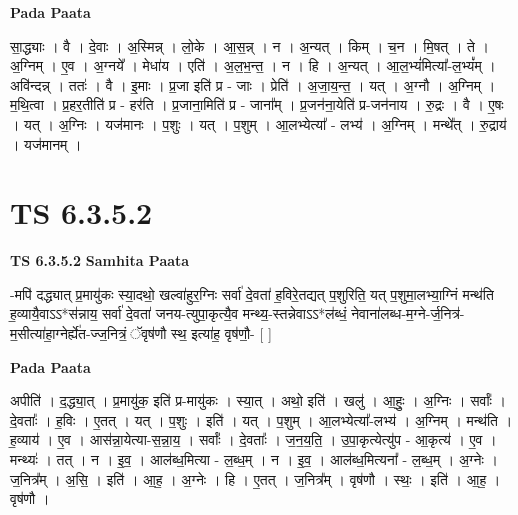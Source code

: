 \documentclass[17pt]{extarticle}
\begin{document}
\textbf{Pada Paata} \newline

सा॒द्ध्याः । वै । दे॒वाः । अ॒स्मिन्न् । लो॒के । आ॒स॒न्न् । न । अ॒न्यत् । किम् । च॒न । मि॒षत् । ते । अ॒ग्निम् । ए॒व । अ॒ग्नये᳚ । मेधा॑य । एति॑ । अ॒ल॒भ॒न्त॒ । न । हि । अ॒न्यत् । आ॒ल॒भ्यं॑मित्या᳚-ल॒भ्यं᳚म् । अवि॑न्दन्न् । ततः॑ । वै । इ॒माः । प्र॒जा इति॑ प्र - जाः । प्रेति॑ । अ॒जा॒य॒न्त॒ । यत् । अ॒ग्नौ । अ॒ग्निम् । म॒थि॒त्वा । प्र॒हर॒तीति॑ प्र - हर॑ति । प्र॒जाना॒मिति॑ प्र - जाना᳚म् । प्र॒जन॑ना॒येति॑ प्र-जन॑नाय । रु॒द्रः । वै । ए॒षः । यत् । अ॒ग्निः । यज॑मानः । प॒शुः । यत् । प॒शुम् । आ॒लभ्येत्या᳚ - लभ्य॑ । अ॒ग्निम् । मन्थे᳚त् । रु॒द्राय॑ । यज॑मानम् ।  \newline





\section{ TS 6.3.5.2 }

\textbf{TS 6.3.5.2 } \newline
\textbf{Samhita Paata} \newline

-मपि॑ दद्ध्यात् प्र॒मायु॑कः स्या॒दथो॒ खल्वा॑हुर॒ग्निः सर्वा॑ दे॒वता॑ ह॒विरे॒तद्यत् प॒शुरिति॒ यत् प॒शुमा॒लभ्या॒ग्निं मन्थ॑ति ह॒व्यायै॒वाऽऽ*स॑न्नाय॒ सर्वा॑ दे॒वता॑ जनय-त्युपा॒कृत्यै॒व मन्थ्य॒-स्तन्नेवाऽऽ*ल॑ब्धं॒ नेवाना॑लब्ध-म॒ग्ने-र्ज॒नित्र॑-म॒सीत्या॑हा॒ग्नेर्ह्ये॑त-ज्ज॒नित्रं॒ ॅवृष॑णौ स्थ॒ इत्या॑ह॒ वृष॑णौ॒- [  ] \newline

\textbf{Pada Paata} \newline

अपीति॑ । द॒द्ध्या॒त् । प्र॒मायु॑क॒ इति॑ प्र-मायु॑कः । स्या॒त् । अथो॒ इति॑ । खलु॑ । आ॒हुः॒ । अ॒ग्निः । सर्वाः᳚ । दे॒वताः᳚ । ह॒विः । ए॒तत् । यत् । प॒शुः । इति॑ । यत् । प॒शुम् । आ॒लभ्येत्या᳚-लभ्य॑ । अ॒ग्निम् । मन्थ॑ति । ह॒व्याय॑ । ए॒व । आस॑न्ना॒येत्या-स॒न्ना॒य॒ । सर्वाः᳚ । दे॒वताः᳚ । ज॒न॒य॒ति॒ । उ॒पा॒कृत्येत्यु॑प - आ॒कृत्य॑ । ए॒व । मन्थ्यः॑ । तत् । न । इ॒व॒ । आल॑ब्ध॒मित्या - ल॒ब्ध॒म् । न । इ॒व॒ । आल॑ब्ध॒मित्यना᳚ - ल॒ब्ध॒म् । अ॒ग्नेः । ज॒नित्र᳚म् । अ॒सि॒ । इति॑ । आ॒ह॒ । अ॒ग्नेः । हि । ए॒तत् । ज॒नित्र᳚म् । वृष॑णौ । स्थः॒ । इति॑ । आ॒ह॒ । वृष॑णौ ।  \newline




\end{document}
